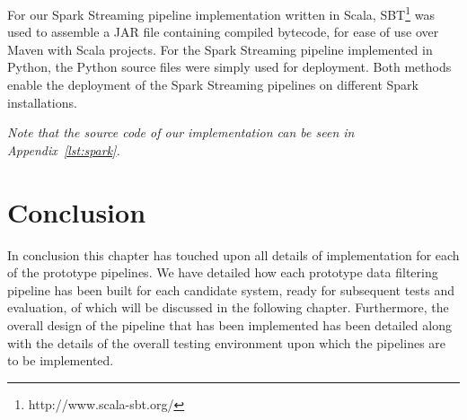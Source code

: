 For our Spark Streaming pipeline implementation written in Scala, SBT\footnote{http://www.scala-sbt.org/} was used to assemble a JAR file containing compiled
bytecode, for ease of use over Maven with Scala projects. For the Spark Streaming pipeline implemented in Python, the
Python source files were simply used for deployment. Both methods enable the deployment of the Spark Streaming pipelines on
different Spark installations.

\textit{Note that the source code of our implementation can be seen in Appendix~\ref{lst:spark}.}





\section{Conclusion} %
\label{sub:implement_conclusion}

In conclusion this chapter has touched upon all details of implementation for each of the prototype pipelines.
We have detailed how each prototype data filtering pipeline has been built for each candidate system, ready
for subsequent tests and evaluation, of which will be discussed in the following chapter. Furthermore, the overall
design of the pipeline that has been implemented has been detailed along with the details of the overall testing
environment upon which the pipelines are to be implemented.

